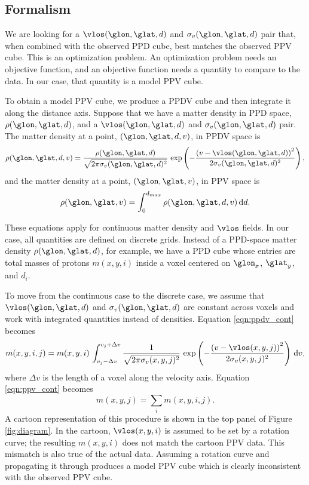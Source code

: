 \subsection{Formalism}
\label{sec:KT-method}
We are looking for a $\vlos(\glon, \glat, d)$ and $\sigma_v(\glon, \glat, d)$ pair that, when combined with the observed PPD cube, best matches the observed PPV cube. 
This is an optimization problem. 
An optimization problem needs an objective function, and an objective function needs a quantity to compare to the data. 
In our case, that quantity is a model PPV cube.

To obtain a model PPV cube, we produce a PPDV cube and then integrate it along the distance axis. 
Suppose that we have a matter density in PPD space, $\rho(\glon, \glat, d)$, and a $\vlos(\glon, \glat, d)$ and $\sigma_v(\glon, \glat, d)$ pair. 
The matter density at a point, $(\glon, \glat, d, v)$, in PPDV space is 
\begin{equation}
 \label{eqn:ppdv_cont}
  \rho(\glon, \glat, d, v) = \frac{\rho(\glon, \glat, d)}{\sqrt{2 \pi \sigma_v(\glon, \glat, d)^2}} 
   \, \exp\left(- \frac{\left( v - \vlos(\glon, \glat, d) \right)^2}{2 \sigma_v(\glon, \glat, d)^2} \right),
\end{equation}
and the matter density at a point, $(\glon, \glat, v)$, in PPV space is
\begin{equation}
  \label{eqn:ppv_cont}
  \rho(\glon, \glat, v) = \int_0^{d_{max}} \rho(\glon, \glat, d, v) \, {\rm d}d.
\end{equation}

These equations apply for continuous matter density and $\vlos$ fields.
In our case, all quantities are defined on discrete grids. 
Instead of a PPD-space matter density $\rho(\glon, \glat, d)$, for example, we have a PPD cube whose entries are total masses of protons $m(x, y, i)$ inside a voxel centered on $\glon_x$, $\glat_y$, and $d_i$.

To move from the continuous case to the discrete case, we assume that $\vlos(\glon, \glat, d)$ and $\sigma_v(\glon, \glat, d)$ are constant across voxels and work with integrated quantities instead of densities. 
Equation \ref{eqn:ppdv_cont} becomes
\begin{equation}
  \label{eqn:ppdv_disc}
  m(x, y, i, j) = m(x, y, i) \, \int_{v_j - \Delta v}^{v_j + \Delta v} 
 \frac{1}{\sqrt{2 \pi \sigma_v(x, y, j)^2}} \,
    \exp\left(- \frac{\left( v - \vlos(x, y, j) \right)^2}{2 \sigma_v(x, y, j)^2} \right)\, {\rm d}v,
\end{equation}
where $\Delta v$ is the length of a voxel along the velocity axis.
Equation \ref{eqn:ppv_cont} becomes
\begin{equation}
  \label{eqn:ppv_disc}
  m(x, y, j) = \sum_{i} m(x, y, i, j).
\end{equation}
A cartoon representation of this procedure is shown in the top panel of Figure \ref{fig:diagram}.
In the cartoon, $\vlos(x, y, i)$ is assumed to be set by a rotation curve; the resulting $m(x, y, i)$ does not match the cartoon PPV data.
This mismatch is also true of the actual data.
Assuming a rotation curve and propagating it through produces a model PPV cube which is clearly inconsistent with the observed PPV cube. 

